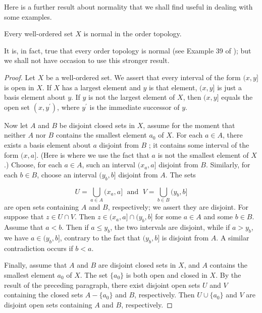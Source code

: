 Here is a further result about normality that we shall find useful in dealing with some examples.

\begin{theorem}
\label{thm:\thetheorem}
 Every well-ordered set \(X\) is normal in the order topology.

It is, in fact, true that every order topology is normal (see Example 39 of \cite{SteenSeebach1970}); but we shall not have occasion to use this stronger result.

\end{theorem}
\begin{proof}
 Let \(X\) be a well-ordered set. We assert that every interval of the form \((x,y\rbrack\) is open in \(X\). If \(X\) has a largest element and \(y\) is that element, \((x,y\rbrack\) is just a basis element about \(y\). If \(y\) is not the largest element of \(X\), then \((x,y\rbrack\) equals the open set \(( {x,y^{\prime }})\), where \(y^{\prime }\) is the immediate successor of \(y\).

Now let \(A\) and \(B\) be disjoint closed sets in \(X\), assume for the moment that neither \(A\) nor \(B\) contains the smallest element \(a_{0}\) of \(X\). For each \(a \in A\), there exists a basis element about \(a\) disjoint from \(B\) ; it contains some interval of the form \((x,a\rbrack\). (Here is where we use the fact that \(a\) is not the smallest element of \(X\).) Choose, for each \(a \in A\), such an interval \(( {x_{a},a}]\) disjoint from \(B\). Similarly, for each \(b \in B\), choose an interval \(( {y_{b},b}]\) disjoint from \(A\). The sets

\[
U = \mathop{\bigcup }\limits_{{a \in A}}( {x_{a},a}] \;\text{ and }\;V = \mathop{\bigcup }\limits_{{b \in B}}( {y_{b},b}]
\]
are open sets containing \(A\) and \(B\), respectively; we assert they are disjoint. For suppose that \(z \in U \cap V\). Then \(z \in ( {x_{a},a}] \cap ( {y_{b},b}]\) for some \(a \in A\) and some \(b \in B\). Assume that \(a < b\). Then if \(a \leq {y}_{b}\), the two intervals are disjoint, while if \(a > y_{b}\), we have \(a \in ( {y_{b},b}]\), contrary to the fact that \(( {y_{b},b}]\) is disjoint from \(A\). A similar contradiction occurs if \(b < a\).

Finally, assume that \(A\) and \(B\) are disjoint closed sets in \(X\), and \(A\) contains the smallest element \(a_{0}\) of \(X\). The set \(\{ a_{0}\}\) is both open and closed in \(X\). By the result of the preceding paragraph, there exist disjoint open sets \(U\) and \(V\) containing the closed sets \(A - \{ a_{0}\}\) and \(B\), respectively. Then \(U \cup \{ a_{0}\}\) and \(V\) are disjoint open sets containing \(A\) and \(B\), respectively.
\end{proof}

